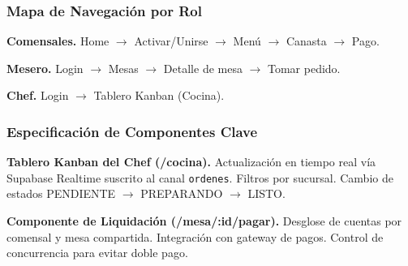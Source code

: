 \subsubsection{Mapa de Navegación por Rol}

\noindent\textbf{Comensales.} Home $\rightarrow$ Activar/Unirse $\rightarrow$ Menú $\rightarrow$ Canasta $\rightarrow$ Pago.

\noindent\textbf{Mesero.} Login $\rightarrow$ Mesas $\rightarrow$ Detalle de mesa $\rightarrow$ Tomar pedido.

\noindent\textbf{Chef.} Login $\rightarrow$ Tablero Kanban (Cocina).

\subsubsection{Especificación de Componentes Clave}

\noindent\textbf{Tablero Kanban del Chef (/cocina).} Actualización en tiempo
real vía Supabase Realtime suscrito al canal \texttt{ordenes}. Filtros por
sucursal. Cambio de estados PENDIENTE $\rightarrow$ PREPARANDO $\rightarrow$ LISTO.

\noindent\textbf{Componente de Liquidación (/mesa/:id/pagar).} Desglose de
cuentas por comensal y mesa compartida. Integración con gateway de pagos.
Control de concurrencia para evitar doble pago.
